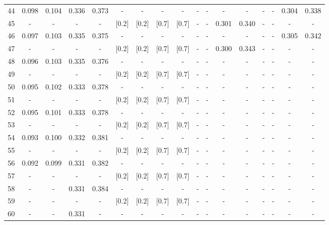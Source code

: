 \documentclass{report}
\begin{document}
\begin{appendices}
\begin{table}
\begin{tabular}{|c|cccc|cccc|cccc|cccc|}
44 & 0.098 & 0.104 & 0.336 & 0.373 &   -   &   -   &   -   &   -   &   -   &   -   &   -   &   -   &   -   &   -   & 0.304 & 0.338\\
45 &   -   &   -   &   -   &   -   & [0.2] & [0.2] & [0.7] & [0.7] &   -   &   -   & 0.301 & 0.340 &   -   &   -   &   -   &   -  \\
46 & 0.097 & 0.103 & 0.335 & 0.375 &   -   &   -   &   -   &   -   &   -   &   -   &   -   &   -   &   -   &   -   & 0.305 & 0.342\\
47 &   -   &   -   &   -   &   -   & [0.2] & [0.2] & [0.7] & [0.7] &   -   &   -   & 0.300 & 0.343 &   -   &   -   &   -   &   -  \\
48 & 0.096 & 0.103 & 0.335 & 0.376 &   -   &   -   &   -   &   -   &   -   &   -   &   -   &   -   &   -   &   -   &   -   &   -  \\
49 &   -   &   -   &   -   &   -   & [0.2] & [0.2] & [0.7] & [0.7] &   -   &   -   &   -   &   -   &   -   &   -   &   -   &   -  \\
50 & 0.095 & 0.102 & 0.333 & 0.378 &   -   &   -   &   -   &   -   &   -   &   -   &   -   &   -   &   -   &   -   &   -   &   -  \\
51 &   -   &   -   &   -   &   -   & [0.2] & [0.2] & [0.7] & [0.7] &   -   &   -   &   -   &   -   &   -   &   -   &   -   &   -  \\
52 & 0.095 & 0.101 & 0.333 & 0.378 &   -   &   -   &   -   &   -   &   -   &   -   &   -   &   -   &   -   &   -   &   -   &   -  \\
53 &   -   &   -   &   -   &   -   & [0.2] & [0.2] & [0.7] & [0.7] &   -   &   -   &   -   &   -   &   -   &   -   &   -   &   -  \\
54 & 0.093 & 0.100 & 0.332 & 0.381 &   -   &   -   &   -   &   -   &   -   &   -   &   -   &   -   &   -   &   -   &   -   &   -  \\
55 &   -   &   -   &   -   &   -   & [0.2] & [0.2] & [0.7] & [0.7] &   -   &   -   &   -   &   -   &   -   &   -   &   -   &   -  \\
56 & 0.092 & 0.099 & 0.331 & 0.382 &   -   &   -   &   -   &   -   &   -   &   -   &   -   &   -   &   -   &   -   &   -   &   -  \\
57 &   -   &   -   &   -   &   -   & [0.2] & [0.2] & [0.7] & [0.7] &   -   &   -   &   -   &   -   &   -   &   -   &   -   &   -  \\
58 &   -   &   -   & 0.331 & 0.384 &   -   &   -   &   -   &   -   &   -   &   -   &   -   &   -   &   -   &   -   &   -   &   -  \\
59 &   -   &   -   &   -   &   -   & [0.2] & [0.2] & [0.7] & [0.7] &   -   &   -   &   -   &   -   &   -   &   -   &   -   &   -  \\
60 &   -   &   -   & 0.331 &   -   &   -   &   -   &   -   &   -   &   -   &   -   &   -   &   -   &   -   &   -   &   -   &   -  \\
\hline
\end{tabular}
\end{table}


\end{appendices}
\end{document}
